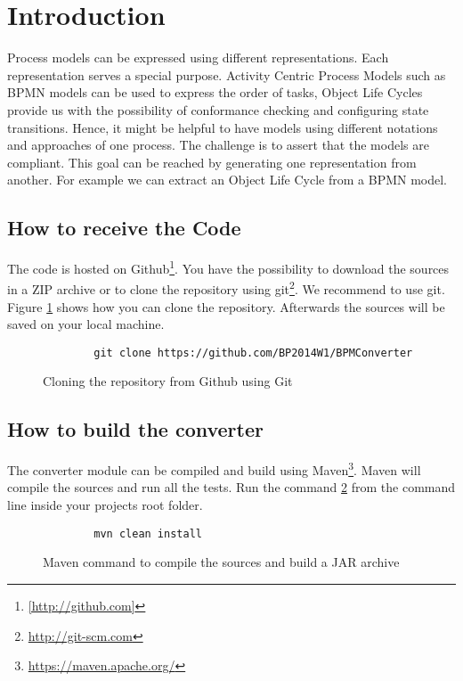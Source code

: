 \section{Introduction}

Process models can be expressed using different representations.
Each representation serves a special purpose.
Activity Centric Process Models such as BPMN models can be used to express the order of tasks, Object Life Cycles provide us with the possibility of conformance checking and configuring state transitions.
Hence, it might be helpful to have models using different notations and approaches of one process.
The challenge is to assert that the models are compliant.
This goal can be reached by generating one representation from another.
For example we can extract an Object Life Cycle from a BPMN model.

\subsection{How to receive the Code}

The code is hosted on Github\footnote{\url{[http://github.com]}}.
You have the possibility to download the sources in a ZIP archive or to clone the repository using git\footnote{\url{http://git-scm.com}}.
We recommend to use git.
Figure \ref{lis:clone} shows how you can clone the repository.
Afterwards the sources will be saved on your local machine.

\begin{figure}[h]
	\begin{verbatim}
		git clone https://github.com/BP2014W1/BPMConverter
	\end{verbatim}
	\caption{Cloning the repository from Github using Git}
	\label{lis:clone}
\end{figure}

\subsection{How to build the converter}
\label{subsec:build}

The converter module can be compiled and build using Maven\footnote{\url{https://maven.apache.org/}}.
Maven will compile the sources and run all the tests.
Run the command \ref{lis:mvn} from the command line inside your projects root folder.

\begin{figure}[h]
	\begin{verbatim}
		mvn clean install
	\end{verbatim}
	\caption{Maven command to compile the sources and build a JAR archive}
	\label{lis:mvn}
\end{figure}